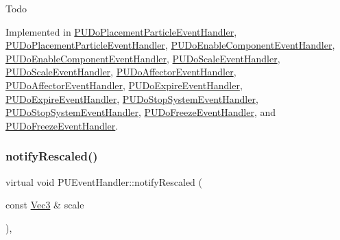 Todo 

Implemented in \hyperlink{classPUDoPlacementParticleEventHandler_a12d37fe5d03f1b25b5ba62020d792b3b}{P\+U\+Do\+Placement\+Particle\+Event\+Handler}, \hyperlink{classPUDoPlacementParticleEventHandler_a315d038959b01349560a1e222e3bcfb9}{P\+U\+Do\+Placement\+Particle\+Event\+Handler}, \hyperlink{classPUDoEnableComponentEventHandler_a6d84593dc83b908717c15a5c973d10b4}{P\+U\+Do\+Enable\+Component\+Event\+Handler}, \hyperlink{classPUDoEnableComponentEventHandler_a1c27b9000122f25304629fd2487c6e50}{P\+U\+Do\+Enable\+Component\+Event\+Handler}, \hyperlink{classPUDoScaleEventHandler_a0d4d629277b91a58487794e2791f041d}{P\+U\+Do\+Scale\+Event\+Handler}, \hyperlink{classPUDoScaleEventHandler_abf88206cfacb19b198323e5a15c74f6a}{P\+U\+Do\+Scale\+Event\+Handler}, \hyperlink{classPUDoAffectorEventHandler_a73dcf140c4011202233774858c1b6e02}{P\+U\+Do\+Affector\+Event\+Handler}, \hyperlink{classPUDoAffectorEventHandler_a5eb0b94268f5f65462590649b53b50e6}{P\+U\+Do\+Affector\+Event\+Handler}, \hyperlink{classPUDoExpireEventHandler_a13edfa6a313f4306bb4815c670d98689}{P\+U\+Do\+Expire\+Event\+Handler}, \hyperlink{classPUDoExpireEventHandler_a28cf9f9bea21b57152c12c52ff6eff91}{P\+U\+Do\+Expire\+Event\+Handler}, \hyperlink{classPUDoStopSystemEventHandler_ad80081500e5553c7a76c2f0b966b9f42}{P\+U\+Do\+Stop\+System\+Event\+Handler}, \hyperlink{classPUDoStopSystemEventHandler_aedf9765b3b2652fd3828f4be017a727c}{P\+U\+Do\+Stop\+System\+Event\+Handler}, \hyperlink{classPUDoFreezeEventHandler_a961d110b3aa250a3a2d9d95a049aa299}{P\+U\+Do\+Freeze\+Event\+Handler}, and \hyperlink{classPUDoFreezeEventHandler_a0203ad7344e56fb7c6676222973da0cc}{P\+U\+Do\+Freeze\+Event\+Handler}.

\mbox{\label{classPUEventHandler_a3bd376b30698822a875d2c2c9b19075f}} 
\subsubsection{\texorpdfstring{notify\+Rescaled()}{notifyRescaled()}\hspace{0.1cm}{\footnotesize\ttfamily [1/2]}}
{\footnotesize\ttfamily virtual void P\+U\+Event\+Handler\+::notify\+Rescaled (\begin{DoxyParamCaption}\item[{const \hyperlink{classVec3}{Vec3} \&}]{scale }\end{DoxyParamCaption})\hspace{0.3cm}{\ttfamily [inline]}, {\ttfamily [virtual]}}

